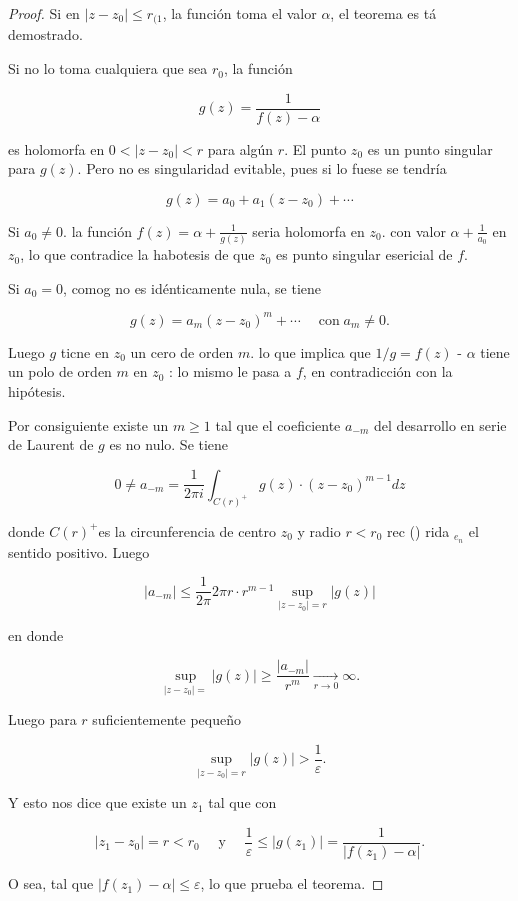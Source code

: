 \documentclass[10pt]{article}
\theoremstyle{plain}
\theoremstyle{definition}
\theoremstyle{remark}
\begin{document}
\begin{proof}
Si en $\left|z-z_{0}\right| \leqslant r_{(1}$, la función toma el valor $\alpha$, el teorema es tá demostrado.

Si no lo toma cualquiera que sea $r_{0}$, la función

$$
g(z)=\frac{1}{f(z)-\alpha}
$$

es holomorfa en $0<\left|z-z_{0}\right|<r$ para algún $r$. El punto $z_{0}$ es un punto singular para $g(z)$. Pero no es singularidad evitable, pues si lo fuese se tendría

$$
g(z)=a_{0}+a_{1}\left(z-z_{0}\right)+\cdots
$$

Si $a_{0} \neq 0$. la función $f(z)=\alpha+\frac{1}{g(z)}$ seria holomorfa en $z_{0}$. con valor $\alpha+\frac{1}{a_{0}}$ en $z_{0}$, lo que contradice la habotesis de que $z_{0}$ es punto singular esericial de $f$.

Si $a_{0}=0$, comog no es idénticamente nula, se tiene

$$
g(z)=a_{m}\left(z-z_{0}\right)^{m}+\cdots \quad \operatorname{con} a_{m} \neq 0 .
$$

Luego $g$ ticne en $z_{0}$ un cero de orden $m$. lo que implica que $1 / g=f(z)$ - $\alpha$ tiene un polo de orden $m$ en $z_{0}$ : lo mismo le pasa a $f$, en contradicción con la hipótesis.

Por consiguiente existe un $m \geqslant 1$ tal que el coeficiente $a_{-m}$ del desarrollo en serie de Laurent de $g$ es no nulo. Se tiene

$$
0 \neq a_{-m}=\frac{1}{2 \pi i} \int_{C(r)^{+}} g(z) \cdot\left(z-z_{0}\right)^{m-1} d z
$$

donde $C(r)^{+}$es la circunferencia de centro $z_{0}$ y radio $r<r_{0}$ rec () rida ${ }_{e_{n}}$ el sentido positivo. Luego

$$
\left|a_{-m}\right| \leqslant \frac{1}{2 \pi} 2 \pi r \cdot r^{m-1} \sup _{\left|z-z_{0}\right|=r}|g(z)|
$$

en donde

$$
\sup _{\left|z-z_{0}\right|=}|g(z)| \geqslant \frac{\left|a_{-m}\right|}{r^{m}} \xrightarrow[r \longrightarrow 0]{ } \infty .
$$

Luego para $r$ suficientemente pequeño

$$
\sup _{\left|z-z_{0}\right|=r}|g(z)|>\frac{1}{\varepsilon} .
$$

Y esto nos dice que existe un $z_{1}$ tal que con

$$
\left|z_{1}-z_{0}\right|=r<r_{0} \quad \text { y } \quad \frac{1}{\varepsilon} \leqslant\left|g\left(z_{1}\right)\right|=\frac{1}{\left|f\left(z_{1}\right)-\alpha\right|} .
$$

O sea, tal que $\left|f\left(z_{1}\right)-\alpha\right| \leqslant \varepsilon$, lo que prueba el teorema.
\end{proof}
\end{document}
